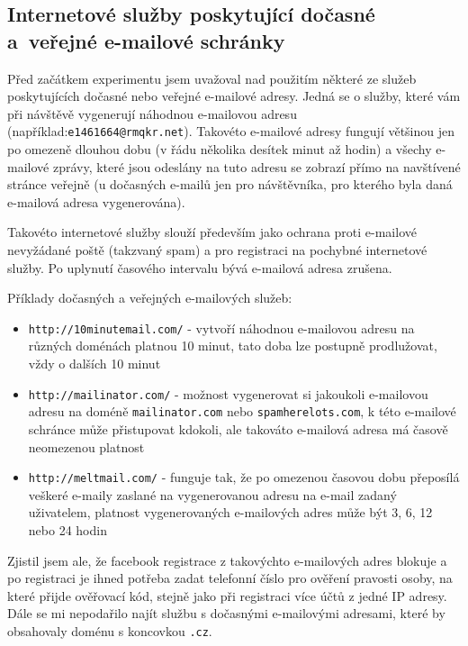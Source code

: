 \documentclass[thesis=M,czech]{FITthesis}[2013/05/10]
\begin{document}
\subsection{Internetové služby poskytující dočasné a~veřejné e-mailové schránky}

Před začátkem experimentu jsem uvažoval nad použitím některé ze služeb poskytujících dočasné nebo veřejné e-mailové adresy. Jedná se o služby, které vám při návštěvě vygenerují náhodnou e-mailovou adresu (například:\newline \verb|e1461664@rmqkr.net|). Takovéto e-mailové adresy fungují většinou jen po omezeně dlouhou dobu (v řádu několika desítek minut až hodin) a všechy e-mailové zprávy, které jsou odeslány na tuto adresu se zobrazí přímo na navštívené stránce veřejně (u dočasných e-mailů jen pro návštěvníka, pro kterého byla daná e-mailová adresa vygenerována).

Takovéto internetové služby slouží především jako ochrana proti e-mailové nevyžádané poště (takzvaný spam) a pro registraci na pochybné internetové služby. Po uplynutí časového intervalu bývá e-mailová adresa zrušena.

Příklady dočasných a veřejných e-mailových služeb:

\begin{itemize}
  \item \verb|http://10minutemail.com/| - vytvoří náhodnou e-mailovou adresu na různých doménách platnou 10 minut, tato doba lze postupně prodlužovat, vždy o dalších 10 minut
  \item \verb|http://mailinator.com/| - možnost vygenerovat si jakoukoli e-mailovou adresu na doméně \verb|mailinator.com| nebo \verb|spamherelots.com|, k této e-mailové schránce může přistupovat kdokoli, ale takováto e-mailová adresa má časově neomezenou platnost
  \item \verb|http://meltmail.com/| - funguje tak, že po omezenou časovou dobu přeposílá veškeré e-maily zaslané na vygenerovanou adresu na e-mail zadaný uživatelem, platnost vygenerovaných e-mailových adres může být 3, 6, 12 nebo 24 hodin
\end{itemize}

Zjistil jsem ale, že facebook registrace z takovýchto e-mailových adres blokuje a po registraci je ihned potřeba zadat telefonní číslo pro ověření pravosti osoby, na které přijde ověřovací kód, stejně jako při registraci více účtů z jedné IP adresy. Dále se mi nepodařilo najít službu s dočasnými e-mailovými adresami, které by obsahovaly doménu s koncovkou \verb|.cz|. 
\end{document}
